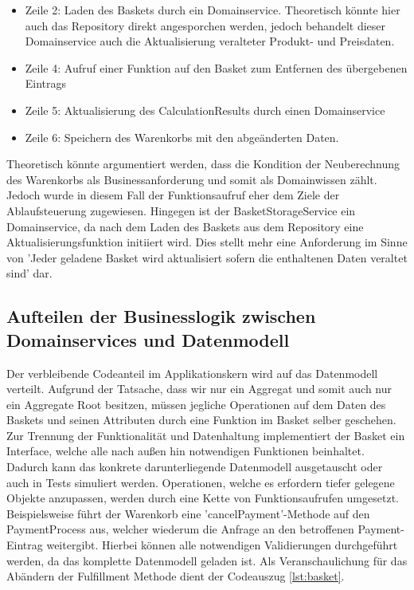 \begin{itemize}[noitemsep,nolistsep]
	\item Zeile 2: Laden des Baskets durch ein Domainservice. Theoretisch könnte hier auch das Repository direkt angesporchen werden, jedoch behandelt dieser Domainservice auch die Aktualisierung veralteter Produkt- und Preisdaten.
	\item Zeile 4: Aufruf einer Funktion auf den Basket zum Entfernen des übergebenen Eintrags
	\item Zeile 5: Aktualisierung des CalculationResults durch einen Domainservice
	\item Zeile 6: Speichern des Warenkorbs mit den abgeänderten Daten.
\end{itemize}

Theoretisch könnte argumentiert werden, dass die Kondition der Neuberechnung des Warenkorbs als Businessanforderung und somit als Domainwissen zählt. Jedoch wurde in diesem Fall der Funktionsaufruf eher dem Ziele der Ablaufsteuerung zugewiesen. Hingegen ist der BasketStorageService ein Domainservice, da nach dem Laden des Baskets aus dem Repository eine Aktualisierungsfunktion initiiert wird. Dies stellt mehr eine Anforderung im Sinne von 'Jeder geladene Basket wird aktualisiert sofern die enthaltenen Daten veraltet sind' dar. 

\subsection{Aufteilen der Businesslogik zwischen Domainservices und Datenmodell}

Der verbleibende Codeanteil im Applikationskern wird auf das Datenmodell verteilt. Aufgrund der Tatsache, dass wir nur ein Aggregat und somit auch nur ein Aggregate Root besitzen, müssen jegliche Operationen auf dem Daten des Baskets und seinen Attributen durch eine Funktion im Basket selber geschehen. Zur Trennung der Funktionalität und Datenhaltung implementiert der Basket ein Interface, welche alle nach außen hin notwendigen Funktionen beinhaltet. Dadurch kann das konkrete darunterliegende Datenmodell ausgetauscht oder auch in Tests simuliert werden. Operationen, welche es erfordern tiefer gelegene Objekte anzupassen, werden durch eine Kette von Funktionsaufrufen umgesetzt. Beispielsweise führt der Warenkorb eine 'cancelPayment'-Methode auf den PaymentProcess aus, welcher wiederum die Anfrage an den betroffenen Payment-Eintrag weitergibt. Hierbei können alle notwendigen Validierungen durchgeführt werden, da das komplette Datenmodell geladen ist. Als Veranschaulichung für das Abändern der Fulfillment Methode dient der Codeauszug \ref{lst:basket}.

